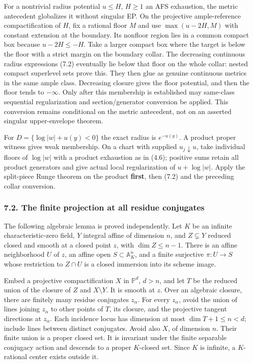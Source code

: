 \documentclass[
  10pt,
]{article}
\begin{document}
For a nontrivial radius potential \(u\le H\), \(H\ge1\) an AFS
exhaustion, the metric antecedent globalizes it without singular EP. On
the projective ample-reference compactification of \(H\), fix a rational
floor \(M\) and use \(\max(u-2H,M)\) with constant extension at the
boundary. Its nonfloor region lies in a common compact box because
\(u-2H\le-H\). Take a larger compact box where the target is below the
floor with a strict margin on the boundary collar. The decreasing
continuous radius expressions (7.2) eventually lie below that floor on
the whole collar: nested compact superlevel sets prove this. They then
glue as genuine continuous metrics in the same ample class. Decreasing
closure gives the floor potential, and then the floor tends to
\(-\infty\). Only after this membership is established may same-class
sequential regularization and section/generator conversion be applied.
This conversion remains conditional on the metric antecedent, not on an
asserted singular upper-envelope theorem.

For \(D=\{\log|w|+u(y)<0\}\) the exact radius is \(e^{-u(y)}\). A
product proper witness gives weak membership. On a chart with supplied
\(u_j\downarrow u\), take individual floors of \(\log|w|\) with a
product exhaustion as in (4.6); positive sums retain all product
generators and give actual local regularization of \(u+\log|w|\). Apply
the split-piece Runge theorem on the product \textbf{first}, then (7.2)
and the preceding collar conversion.

\subsubsection{7.2. The finite projection at all residue
conjugates}\label{the-finite-projection-at-all-residue-conjugates}

The following algebraic lemma is proved independently. Let \(K\) be an
infinite characteristic-zero field, \(Y\) integral affine of dimension
\(n\), and \(Z\subsetneq Y\) reduced closed and smooth at a closed point
\(z\), with \(\dim Z\le n-1\). There is an affine neighborhood \(U\) of
\(z\), an affine open \(S\subset\mathbb A_K^n\), and a finite surjective
\(\pi:U\to S\) whose restriction to \(Z\cap U\) is a closed immersion
into its scheme image.

Embed a projective compactification \(X\) in \(\mathbb P^d\), \(d>n\),
and let \(T\) be the reduced union of the closure of \(Z\) and
\(X\setminus Y\). It is smooth at \(z\). Over an algebraic closure,
there are finitely many residue conjugates \(z_\alpha\). For every
\(z_\alpha\), avoid the union of lines joining \(z_\alpha\) to other
points of \(T\), its closure, and the projective tangent directions at
\(z_\alpha\). Each incidence locus has dimension at most
\(\dim T+1\le n<d\); include lines between distinct conjugates. Avoid
also \(X\), of dimension \(n\). Their finite union is a proper closed
set. It is invariant under the finite separable conjugacy action and
descends to a proper \(K\)-closed set. Since \(K\) is infinite, a
\(K\)-rational center exists outside it.
\end{document}
